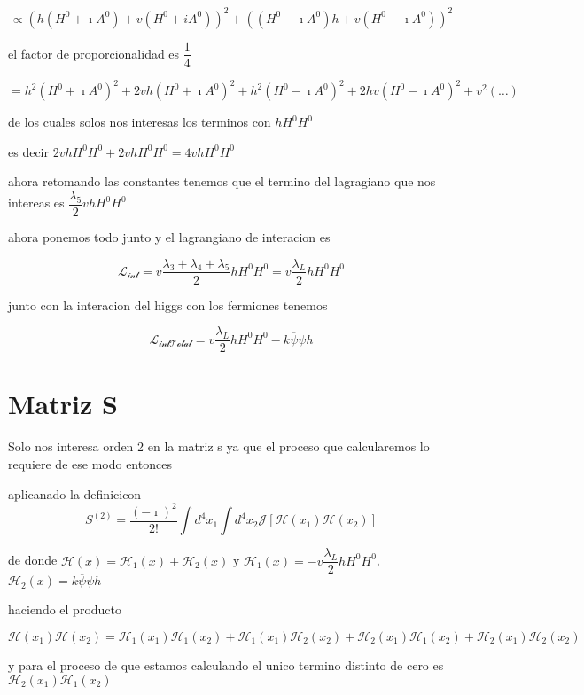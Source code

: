 \[
\propto\left(h(H^{0}+\imath A^{0})+v(H^{0}+iA^{0})\right)^{2}+\left((H^{0}-\imath A^{0})h+v(H^{0}-\imath A^{0})\right)^{2}\]


el factor de proporcionalidad es $\dfrac{1}{4}$

\[
=h^{2}(H^{0}+\imath A^{0})^{2}+2vh(H^{0}+\imath A^{0})^{2}+h^{2}(H^{0}-\imath A^{0})^{2}+2hv(H^{0}-\imath A^{0})^{2}+v^{2}(\ldots)\]


de los cuales solos nos interesas los terminos con $hH^{0}H^{0}$

es decir $2vhH^{0}H^{0}+2vhH^{0}H^{0}=4vhH^{0}H^{0}$

ahora retomando las constantes tenemos que el termino del lagragiano
que nos intereas es $\dfrac{\lambda_{5}}{2}vhH^{0}H^{0}$

ahora ponemos todo junto y el lagrangiano de interacion es 

\[
\mathcal{L_{\textrm{int}}}=v\dfrac{\lambda_{3}+\lambda_{4}+\lambda_{5}}{2}hH^{0}H^{0}=v\dfrac{\lambda_{L}}{2}hH^{0}H^{0}\]


junto con la interacion del higgs con los fermiones tenemos 

\[
\mathcal{L_{\textrm{int}\textrm{Total}}}=v\dfrac{\lambda_{L}}{2}hH^{0}H^{0}-k\overline{\psi}\psi h\]



\section*{Matriz S}

Solo nos interesa orden 2 en la matriz s ya que el proceso que calcularemos
lo requiere de ese modo entonces 

aplicanado la definicicon\[
S^{(2)}=\dfrac{(-\imath)^{2}}{2!}\int d^{4}x_{1}\int d^{4}x_{2}\mathcal{J}\left[\mathcal{H}(x_{1})\mathcal{H}(x_{2})\right]\]


de donde $\mathcal{H}(x)=\mathcal{H}_{1}(x)+\mathcal{H}_{2}(x)$ y
$\mathcal{H}_{1}(x)=-v\dfrac{\lambda_{L}}{2}hH^{0}H^{0}$, $\mathcal{H}_{2}(x)=k\overline{\psi}\psi h$

haciendo el producto 

$\mathcal{H}(x_{1})\mathcal{H}(x_{2})=\mathcal{H}_{1}(x_{1})\mathcal{H}_{1}(x_{2})+\mathcal{H}_{1}(x_{1})\mathcal{H}_{2}(x_{2})+\mathcal{H}_{2}(x_{1})\mathcal{H}_{1}(x_{2})+\mathcal{H}_{2}(x_{1})\mathcal{H}_{2}(x_{2})$

y para el proceso de que estamos calculando el unico termino distinto
de cero es $\mathcal{H}_{2}(x_{1})\mathcal{H}_{1}(x_{2})$


